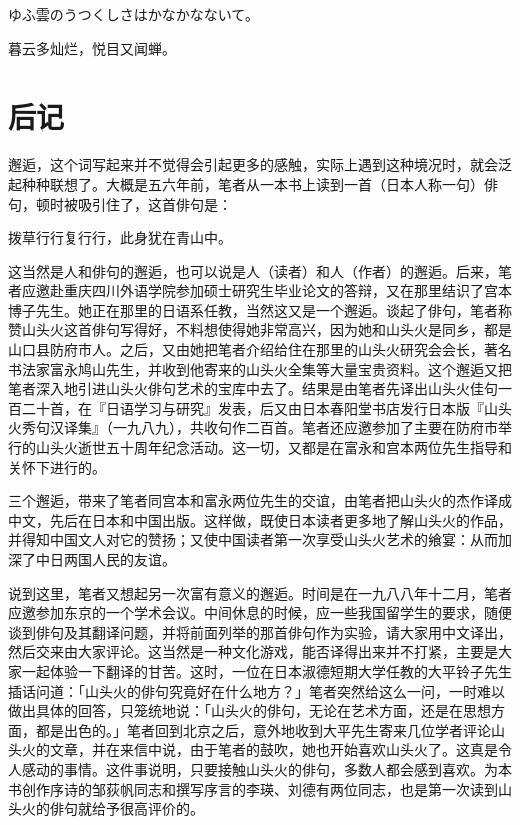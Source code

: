 \begin{haiku}
    {\FH ゆふ雲のうつくしさはかなかなないて。}

    {\FK 暮云多灿烂，悦目又闻蝉。}
\end{haiku}

\chapter{\FK 后记}

{\FS
    邂逅，这个词写起来并不觉得会引起更多的感触，实际上遇到这种境况时，就会泛起种种联想了。大概是五六年前，笔者从一本书上读到一首（日本人称一句）俳句，顿时被吸引住了，这首俳句是：

    拨草行行复行行，此身犹在青山中。

    这当然是人和俳句的邂逅，也可以说是人（读者）和人（作者）的邂逅。后来，笔者应邀赴重庆四川外语学院参加硕士研究生毕业论文的答辩，又在那里结识了宫本博子先生。她正在那里的日语系任教，当然这又是一个邂逅。谈起了俳句，笔者称赞山头火这首俳句写得好，不料想使得她非常高兴，因为她和山头火是同乡，都是山口县防府市人。之后，又由她把笔者介绍给住在那里的山头火研究会会长，著名书法家富永鸠山先生，并收到他寄来的山头火全集等大量宝贵资料。这个邂逅又把笔者深入地引进山头火俳句艺术的宝库中去了。结果是由笔者先译出山头火佳句一百二十首，在『日语学习与研究』发表，后又由日本春阳堂书店发行日本版『山头火秀句汉译集』（一九八九），共收句作二百首。笔者还应邀参加了主要在防府市举行的山头火逝世五十周年纪念活动。这一切，又都是在富永和宫本两位先生指导和关怀下进行的。

    三个邂逅，带来了笔者同宫本和富永两位先生的交谊，由笔者把山头火的杰作译成中文，先后在日本和中国出版。这样做，既使日本读者更多地了解山头火的作品，并得知中国文人对它的赞扬；又使中国读者第一次享受山头火艺术的飨宴：从而加深了中日两国人民的友谊。

    说到这里，笔者又想起另一次富有意义的邂逅。时间是在一九八八年十二月，笔者应邀参加东京的一个学术会议。中间休息的时候，应一些我国留学生的要求，随便谈到俳句及其翻译问题，并将前面列举的那首俳句作为实验，请大家用中文译出，然后交来由大家评论。这当然是一种文化游戏，能否译得出来并不打紧，主要是大家一起体验一下翻译的甘苦。这时，一位在日本淑德短期大学任教的大平铃子先生插话问道：「山头火的俳句究竟好在什么地方？」笔者突然给这么一问，一时难以做出具体的回答，只笼统地说：「山头火的俳句，无论在艺术方面，还是在思想方面，都是出色的。」笔者回到北京之后，意外地收到大平先生寄来几位学者评论山头火的文章，并在来信中说，由于笔者的鼓吹，她也开始喜欢山头火了。这真是令人感动的事情。这件事说明，只要接触山头火的俳句，多数人都会感到喜欢。为本书创作序诗的邹荻帆同志和撰写序言的李瑛、刘德有两位同志，也是第一次读到山头火的俳句就给予很高评价的。

}
